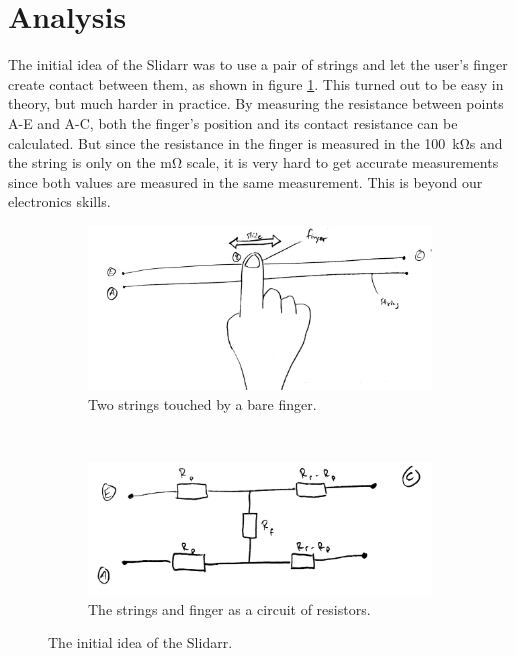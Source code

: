 \documentclass{article}
\begin{document}
\section{Analysis}
The initial idea of the Slidarr was to use a pair of strings and let the user's finger create contact between them, as shown in figure \ref{fig:slidarr_initial_sketch}. This turned out to be easy in theory, but much harder in practice. By measuring the resistance between points A-E and A-C, both the finger's position and its contact resistance can be calculated. But since the resistance in the finger is measured in the \SI{100}{\kilo\ohm}s and the string is only on the \si{\milli\ohm} scale, it is very hard to get accurate measurements since both values are measured in the same measurement. This is beyond our electronics skills.

\begin{figure}[ht]
  \centering
  \begin{subfigure}[b]{0.45\textwidth}
    \includegraphics[width=\textwidth]{slidar_initial}
    \caption{Two strings touched by a bare finger.}
    \label{fig:slidarr_initial_sketch}
  \end{subfigure}
  ~
  \begin{subfigure}[b]{0.45\textwidth}
    \includegraphics[width=\textwidth]{slidar_initial_circuit}
    \caption{The strings and finger as a circuit of resistors.}
    \label{fig:slidarr_initial_circuit}
  \end{subfigure}
  \caption{The initial idea of the Slidarr.}
  \label{fig:slidarr_initial}
\end{figure}
\end{document}
